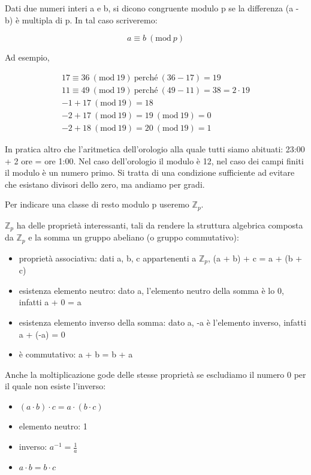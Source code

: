 \documentclass{article}
\newcommand{\Mod}[1]{\ (\mathrm{mod}\ #1)}
\newcommand{\Zp}{\mathbb{Z}_{p}}
\begin{document}
Dati due numeri interi a e b, si dicono congruente modulo p se la differenza (a - b) è multipla di p. In tal caso scriveremo:

$$
a \equiv b \Mod{p}
$$

Ad esempio, 

\begin{align*}
    17 \equiv 36 \Mod{19} \ \text{perché} \ (36 - 17) = 19 \\
    11 \equiv 49 \Mod{19} \ \text{perché} \ (49 - 11) = 38 = 2 \cdot 19 \\
    -1 + 17 \Mod{19} = 18 \\
    -2 + 17 \Mod{19} = 19 \Mod{19} = 0 \\
    -2 + 18 \Mod{19} = 20 \Mod{19} = 1
\end{align*}

In pratica altro che l'aritmetica dell'orologio alla quale tutti siamo abituati: 23:00 + 2 ore = ore 1:00.
Nel caso dell'orologio il modulo è 12, nel caso dei campi finiti il modulo è un numero primo. Si tratta di una condizione sufficiente ad evitare che esistano divisori dello zero, ma andiamo per gradi.

Per indicare una classe di resto modulo p useremo $\Zp$.

$\mathbb{Z}_{p}$ ha delle proprietà interessanti, tali da rendere la struttura algebrica composta da $\Zp$ e la somma un gruppo abeliano (o gruppo commutativo):

\begin{itemize}
    \item proprietà associativa: dati a, b, c appartenenti a $\Zp$, (a + b) + c = a + (b + c)
    \item esistenza elemento neutro: dato a, l’elemento neutro della somma è lo 0, infatti a + 0 = a
    \item esistenza elemento inverso della somma: dato a, -a è l’elemento inverso, infatti a + (-a) = 0
    \item è commutativo: a + b = b + a
\end{itemize}

Anche la moltiplicazione gode delle stesse proprietà se escludiamo il numero 0 per il quale non esiste l’inverso:

\begin{itemize}
    \item $(a \cdot b) \cdot c = a \cdot (b \cdot c)$
    \item elemento neutro: 1
    \item inverso: $a^{-1} = \frac{1}{a}$
    \item $a \cdot b = b \cdot c$
\end{itemize}
\end{document}
